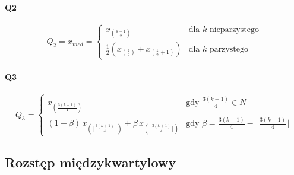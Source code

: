 \documentclass[15pt]{article}
\begin{document}
\paragraph{Q2}
\[
Q_{2} = x_{med} =
    \begin{cases}
        x_{(\frac{k+1}{2})} & \text{dla } k \text{ nieparzystego} \\
        \frac{1}{2} \left( x_{(\frac{k}{2})} + x_{(\frac{k}{2}+1)} \right)
        & \text{dla } k \text{ parzystego}
    \end{cases}
\]

\paragraph{Q3}
\[
Q_{3} =
    \begin{cases}
        x_{(\frac{3(k+1)}{4})} & \text{gdy } \frac{3(k+1)}{4} \in N \\
        (1-\beta)\,x_{(\lfloor\frac{3(k+1)}{4}\rfloor)} + \beta\,x_{(\lceil\frac{3(k+1)}{4}\rceil)}
        & \text{gdy } \beta = \frac{3(k+1)}{4} - \lfloor\frac{3(k+1)}{4}\rfloor
    \end{cases}
\]

\subsection{Rozstęp międzykwartylowy}
\end{document}
